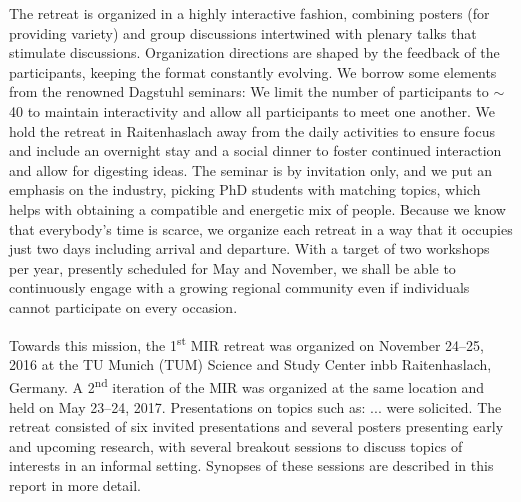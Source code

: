 The retreat is organized in a highly interactive fashion, combining posters
(for providing variety) and group discussions intertwined with plenary talks
that stimulate discussions.  Organization directions are shaped by the
feedback of the participants, keeping the format constantly evolving.  We
borrow some elements from the renowned Dagstuhl seminars: We limit the number
of participants to $\sim$40 to maintain interactivity and allow all
participants to meet one another.  We hold the retreat in Raitenhaslach away
from the daily activities to ensure focus and include an overnight stay and a
social dinner to foster continued interaction and allow for digesting ideas.
The seminar is by invitation only, and we put an emphasis on the industry,
picking PhD students with matching topics, which helps with obtaining a
compatible and energetic mix of people. Because we know that everybody's time
is scarce, we organize each retreat in a way that it occupies just two days
including arrival and departure.  With a target of two workshops per year,
presently scheduled for May and November, we shall be able to continuously
engage with a growing regional community even if individuals cannot
participate on every occasion.

Towards this mission, the 1\textsuperscript{st} \ac{MIR} retreat was organized
on November 24--25, 2016 at the TU Munich (TUM) Science and Study Center inbb
Raitenhaslach, Germany. A 2\textsuperscript{nd} iteration of the \ac{MIR} was
organized at the same location and held on May 23--24, 2017.  Presentations on
topics such as: ... were solicited.  The retreat consisted of six invited
presentations and several posters presenting early and upcoming research, with
several breakout sessions to discuss topics of interests in an informal
setting.  Synopses of these sessions are described in this report in more
detail.

